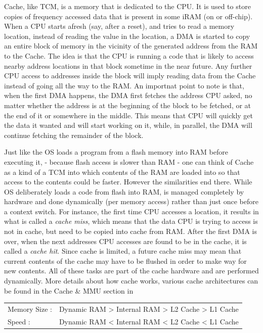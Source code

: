 Cache, like TCM, is a memory that is dedicated to the CPU. It is used to store copies of frequency accessed data that is present in some iRAM (on or off-chip). When a CPU starts afresh (say, after a reset), and tries to read a memory location, instead of reading the value in the location, a DMA is started to copy an entire block of memory in the vicinity of the generated address from the RAM to the Cache. The idea is that the CPU is running a code that is likely to access nearby address locations in that block sometime in the near future. Any further CPU access to addresses inside the block will imply reading data from the Cache instead of going all the way to the RAM. An importnat point to note is that, when the first DMA happens, the DMA first fetches the address CPU asked, no matter whether the address is at the beginning of the block to be fetched, or at the end of it or somewhere in the middle. This means that CPU will quickly get the data it wanted and will start working on it, while, in parallel, the DMA will continue fetching the remainder of the block. 

Just like the OS loads a program from a flash memory into RAM before executing it, - because flash access is slower than RAM - one can think of Cache as a kind of a TCM into which contents of the RAM are loaded into so that access to the contents could be faster. However the similarities end there. While OS deliberately loads a code from flash into RAM, is managed completely by hardware and done dynamically (per memory access) rather than just once before a context switch. For instance, the first time CPU accesses a location, it results in what is called a \emph{cache miss}, which means that the data CPU is trying to access is not in cache, but need to be copied into cache from RAM. After the first DMA is over, when the next addresses CPU accesses are found to be in the cache, it is called a \emph{cache hit}. Since cache is limited, a future cache miss may mean that current contents of the cache may have to be flushed in order to make way for new contents. All of these tasks are part of the cache hardware and are performed dynamically.  More details about how cache works, various cache architectures can be found in the Cache \& MMU section in 

	\begin{highlightedText}
	\begin{tabular}{l r}
		Memory Size : & Dynamic RAM > Internal RAM > L2 Cache > L1 Cache\\
		Speed : & Dynamic RAM < Internal RAM < L2 Cache < L1 Cache\\
	\end{tabular}
	\end{highlightedText}

